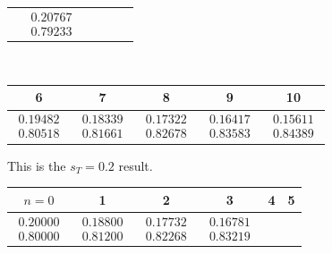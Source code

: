\begin{ans}{5}
\begin{exparts}
\begin{center}
\begin{tabular}{c|ccccc}
               &$\begin{array}{c}  0.20767 \\ 0.79233 \end{array}$
             \end{tabular}                                     \\[1ex]
             \begin{tabular}{|ccccc}
               6  &7  &8  &9 &10 \\
               \hline
               $\begin{array}{c}  0.19482 \\ 0.80518 \end{array}$
               &$\begin{array}{c}  0.18339 \\ 0.81661 \end{array}$
               &$\begin{array}{c}  0.17322 \\ 0.82678 \end{array}$
               &$\begin{array}{c}  0.16417 \\ 0.83583 \end{array}$
               &$\begin{array}{c}  0.15611 \\ 0.84389 \end{array}$
             \end{tabular}
           \end{center}
         \partsitem This is the $s_T=0.2$ result.
           \begin{center}
             \begin{tabular}{c|ccccc}
               $n=0$ &1  &2  &3  &4  &5  \\
               \hline
               $\begin{array}{c}  0.20000 \\ 0.80000 \end{array}$
               &$\begin{array}{c}   0.18800 \\ 0.81200 \end{array}$
               &$\begin{array}{c}   0.17732 \\ 0.82268 \end{array}$
               &$\begin{array}{c}   0.16781 \\ 0.83219 \end{array}$

\end{tabular}
\end{center}
\end{exparts}
\end{ans}
